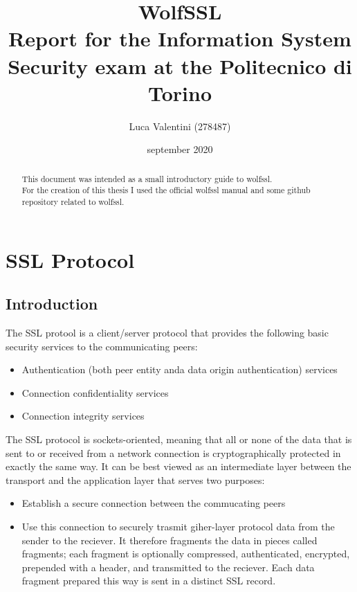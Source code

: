 \documentclass[a4paper,12pt]{article}
\begin{document}
\title{WolfSSL
\\
{\normalsize Report for the Information System Security exam at the Politecnico di Torino}
}
\author{Luca Valentini (278487)
\\
}
\date{september 2020}


\maketitle
\tableofcontents


\newpage
\begin{abstract}
This document was intended as a small introductory guide to wolfssl.
\\For the creation of this thesis I used the official wolfssl manual and some github repository related to wolfssl.
\end{abstract}
\newpage


\section{SSL Protocol}

\subsection{Introduction}
The SSL protool is a client/server protocol that provides the following basic security services to the communicating peers:
\begin{itemize}
	\item Authentication (both peer entity anda data origin authentication) services
	\item Connection confidentiality services
	\item Connection integrity services
\end{itemize}

The SSL protocol is sockets-oriented, meaning that all or none of the data that is sent to or received from a network connection is cryptographically protected in exactly the same way. It can be best viewed as an intermediate layer between the transport and the application layer that serves two purposes:
\begin{itemize}
	\item Establish a secure connection between the commucating peers
	\item Use this connection to securely trasmit giher-layer protocol data from the sender to the reciever. It therefore fragments the data in pieces called fragments; each fragment is optionally compressed, authenticated, encrypted, prepended with a header, and transmitted to the reciever. Each data fragment prepared this way is sent in a distinct SSL record.
\end{itemize}
\end{document}

